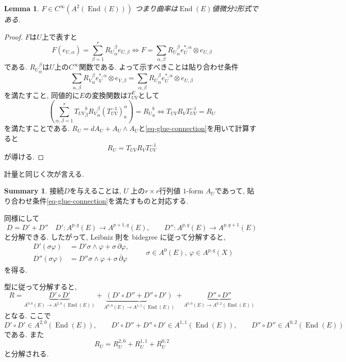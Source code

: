 \documentclass[dvipdfmx,a4paper,11pt]{article} %
\newtheorem{lem}[thm]{Lemma}
\theoremstyle{definition}
\newtheorem{suma}[thm]{Summary}
\theoremstyle{remark}
\numberwithin{equation}{section}
\newcommand{\End}[0]{\operatorname{End}}
\begin{document}
\begin{lem}
$F \in C^{\infty}(A^2(\End(E)))$ つまり曲率は$\End(E)$値微分2形式である. 
\end{lem}
\begin{proof}
$F$は$U$上で表すと
$$
F(e_{U,\alpha})= \sum_{\beta=1}^{r}{R_U}_{\alpha}^{\beta}e_{U,\beta}
\Leftrightarrow
F=\sum_{\alpha,\beta}{R_U}_{\alpha}^{\beta}e^{*,\alpha}_{U} \otimes e_{U,\beta}
$$
である. ${R_U}_{\alpha}^{\beta}$は$U$上の$C^\infty$関数である. 
よって示すべきことは貼り合わせ条件
\[
\sum_{\alpha,\beta}{R_V}_{\alpha}^{\beta}e^{*,\alpha}_{V} \otimes e_{V,\beta}
=
\sum_{\alpha,\beta}{R_U}_{\alpha}^{\beta}e^{*,\alpha}_{U} \otimes e_{U,\beta}
\]
を満たすこと, 同値的に$E$の変換関数は$T^{E}_{UV}$として
\[
\left(
\sum_{\alpha,\beta=1}^{r}
{T_{UV}}^{b}_{\beta}
{R_V}^{\beta}_{\alpha}
{(T_{UV}^{-1})}^{\alpha}_{a}
\right)
={R_U}_{a}^{b}
\Leftrightarrow
T_{UV}R_V T_{UV}^{-1}=R_U
\]
を満たすことである. $R_U=dA_U+A_U\wedge A_U$と\eqref{eq-glue-connection}を用いて計算すると
\[
R_U= T_{UV}R_V T_{UV}^{-1}
\]
が導ける.
\end{proof}


計量と同じく次が言える. 
\begin{tcolorbox}[mybox]
\begin{suma}
接続$D$を与えることは, \(U\) 上の$r \times r$行列値 \(1\)-form 
$A_U$であって, 貼り合わせ条件\eqref{eq-glue-connection}を満たすものと対応する. 
\end{suma}
\end{tcolorbox}


同様にして
\[
D=D'+D''
\quad
D'\colon A^{p, q}(E)\longrightarrow A^{p+1,q}(E),\qquad D''\colon A^{p,q}(E)\longrightarrow A^{p,q+1}(E)
\]
と分解できる. したがって, Leibniz 則を bidegree に従って分解すると,
\[
\begin{aligned}
D'(\sigma\varphi)&=D'\sigma\wedge \varphi+\sigma\, \partial\varphi,\\
D''(\sigma\varphi)&=D''\sigma\wedge \varphi+\sigma\, \overline{\partial}\varphi
\end{aligned}
\qquad \sigma\in A^0(E),\ \varphi\in A^{p, q}(X)
\]
を得る.

型に従って分解すると,
\[
R=\underbrace{D'\circ D'}_{A^{0, 0}(E) \to A^{2, 0}(\End(E))}
+\underbrace{(D'\circ D''+D''\circ D')}_{A^{0, 0}(E) \to A^{1, 1}(\End(E))}
+\underbrace{D''\circ D''}_{A^{0, 0}(E) \to A^{0, 2}(\End(E))}
\]
となる. ここで
\[
D'\circ D'\in A^{2,0}(\End(E)),\qquad D'\circ D''+D''\circ D'\in A^{1,1}(\End(E)),\qquad D''\circ D''\in A^{0,2}(\End(E))
\]
である. また
\[
R_U=R_U^{2,0}+R_U^{1,1}+R_U^{0,2}
\]
と分解される.
\end{document}
